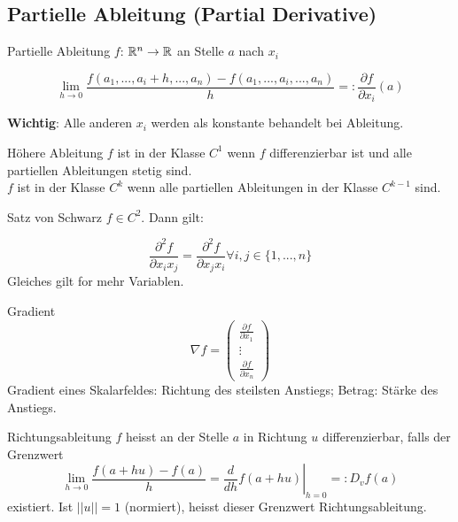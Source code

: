 \subsection{Partielle Ableitung (Partial Derivative)}
\begin{Definition}{Partielle Ableitung}{}
    $f$: $\mathbb{R}^n \rightarrow \mathbb{R}$ an Stelle $a$ nach $x_i$

    \[
        \lim_{h \rightarrow 0} \frac{f(a_1, ..., a_i + h, ..., a_n) - f(a_1, ..., a_i, ..., a_n)}{h} =: \frac{\partial f}{\partial x_i}(a)
    \]

\textbf{Wichtig}: Alle anderen $x_i$ werden als konstante behandelt bei Ableitung.
\end{Definition}

\begin{Definition}{Höhere Ableitung}{}
    $f$ ist in der Klasse $C^1$ wenn $f$ differenzierbar ist und alle partiellen Ableitungen stetig sind.\\
    $f$ ist in der Klasse $C^k$ wenn alle partiellen Ableitungen in der Klasse $C^{k-1}$ sind.
\end{Definition}

\begin{Satz}{Satz von Schwarz}{}
    $f \in C^2$. Dann gilt:

    \[
        \frac{\partial^2 f}{\partial x_i x_j} = \frac{\partial^2 f}{\partial x_j x_i} \forall i, j \in \{1, ..., n\}
    \]
    Gleiches gilt for mehr Variablen.

\end{Satz}


\begin{Definition}{Gradient}{}
    \[
    \nabla f =
        \begin{pmatrix}
            \frac{\partial f}{\partial x_1}\\
            \vdots\\
            \frac{\partial f}{\partial x_n}
        \end{pmatrix}
    \]
    Gradient eines Skalarfeldes: Richtung des steilsten Anstiegs; Betrag: Stärke des Anstiegs.

\end{Definition}

\begin{Definition}{Richtungsableitung}{}
    $f$ heisst an der Stelle $a$ in Richtung $u$ differenzierbar, falls der Grenzwert 
	\[
		\lim_{h\to0}\frac{f(a + hu) -f(a)}{h} =
		\left.\frac{d}{dh}f(a+hu)\right|_{h = 0}
		=: D_vf(a)
	\]
existiert. Ist $||u|| = 1$ (normiert), heisst dieser Grenzwert Richtungsableitung.
\end{Definition}

